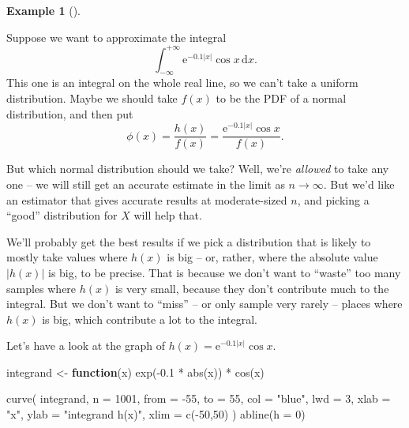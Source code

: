 \documentclass[
  letterpaper,
  DIV=11,
  numbers=noendperiod]{scrreprt}
\newenvironment{Shaded}{\begin{snugshade}}{\end{snugshade}}
\newcommand{\AttributeTok}[1]{\textcolor[rgb]{0.40,0.45,0.13}{#1}}
\newcommand{\ControlFlowTok}[1]{\textcolor[rgb]{0.00,0.23,0.31}{\textbf{#1}}}
\newcommand{\DecValTok}[1]{\textcolor[rgb]{0.68,0.00,0.00}{#1}}
\newcommand{\FloatTok}[1]{\textcolor[rgb]{0.68,0.00,0.00}{#1}}
\newcommand{\FunctionTok}[1]{\textcolor[rgb]{0.28,0.35,0.67}{#1}}
\newcommand{\NormalTok}[1]{\textcolor[rgb]{0.00,0.23,0.31}{#1}}
\newcommand{\OtherTok}[1]{\textcolor[rgb]{0.00,0.23,0.31}{#1}}
\newcommand{\SpecialCharTok}[1]{\textcolor[rgb]{0.37,0.37,0.37}{#1}}
\newcommand{\StringTok}[1]{\textcolor[rgb]{0.13,0.47,0.30}{#1}}
\theoremstyle{plain}
\theoremstyle{definition}
\theoremstyle{definition}
\newtheorem{example}{Example}[chapter]
\theoremstyle{remark}
\begin{document}
\begin{example}[]\protect\hypertarget{exm-MCint2}{}\label{exm-MCint2}

Suppose we want to approximate the integral \[ \int_{-\infty}^{+\infty}
\mathrm{e}^{-0.1|x|} \cos x \, \mathrm{d}x . \] This one is an integral
on the whole real line, so we can't take a uniform distribution. Maybe
we should take \(f(x)\) to be the PDF of a normal distribution, and then
put
\[ \phi(x) = \frac{h(x)}{f(x)} = \frac{\mathrm{e}^{-0.1|x|} \cos x}{f(x)} . \]

But which normal distribution should we take? Well, we're \emph{allowed}
to take any one -- we will still get an accurate estimate in the limit
as \(n \to \infty\). But we'd like an estimator that gives accurate
results at moderate-sized \(n\), and picking a ``good'' distribution for
\(X\) will help that.

We'll probably get the best results if we pick a distribution that is
likely to mostly take values where \(h(x)\) is big -- or, rather, where
the absolute value \(|h(x)|\) is big, to be precise. That is because we
don't want to ``waste'' too many samples where \(h(x)\) is very small,
because they don't contribute much to the integral. But we don't want to
``miss'' -- or only sample very rarely -- places where \(h(x)\) is big,
which contribute a lot to the integral.

Let's have a look at the graph of
\(h(x) = \mathrm{e}^{-0.1|x|} \cos x\).

\begin{Shaded}
\begin{Highlighting}[]
\NormalTok{integrand }\OtherTok{\textless{}{-}} \ControlFlowTok{function}\NormalTok{(x) }\FunctionTok{exp}\NormalTok{(}\SpecialCharTok{{-}}\FloatTok{0.1} \SpecialCharTok{*} \FunctionTok{abs}\NormalTok{(x)) }\SpecialCharTok{*} \FunctionTok{cos}\NormalTok{(x)}

\FunctionTok{curve}\NormalTok{(}
\NormalTok{  integrand, }\AttributeTok{n =} \DecValTok{1001}\NormalTok{, }\AttributeTok{from =} \SpecialCharTok{{-}}\DecValTok{55}\NormalTok{, }\AttributeTok{to =} \DecValTok{55}\NormalTok{,}
  \AttributeTok{col =} \StringTok{"blue"}\NormalTok{, }\AttributeTok{lwd =} \DecValTok{3}\NormalTok{,}
  \AttributeTok{xlab =} \StringTok{"x"}\NormalTok{, }\AttributeTok{ylab =} \StringTok{"integrand h(x)"}\NormalTok{, }\AttributeTok{xlim =} \FunctionTok{c}\NormalTok{(}\SpecialCharTok{{-}}\DecValTok{50}\NormalTok{,}\DecValTok{50}\NormalTok{)}
\NormalTok{)}
\FunctionTok{abline}\NormalTok{(}\AttributeTok{h =} \DecValTok{0}\NormalTok{)}
\end{Highlighting}
\end{Shaded}


\end{example}
\end{document}
